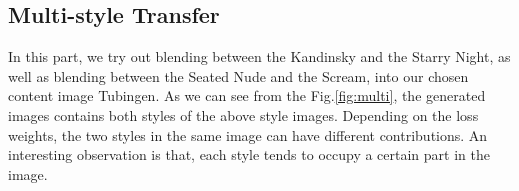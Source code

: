 \documentclass[runningheads]{llncs}
\begin{document}
\subsection{Multi-style Transfer}
In this part, we try out blending between the Kandinsky and the Starry Night, as well as blending between the Seated Nude and the Scream, into our chosen content image Tubingen. As we can see from the Fig.\ref{fig:multi}, the generated images contains both styles of the above style images. Depending on the loss weights, the two styles in the same image can have different contributions. An interesting observation is that, each style tends to occupy a certain part in the image.
\begin{figure}[h!]
\centering
{}
\end{figure}
\end{document}
